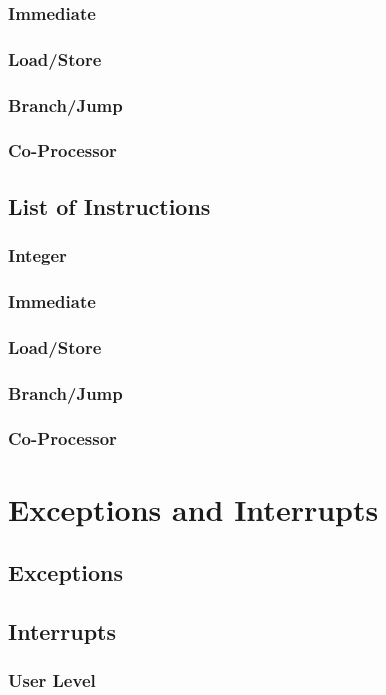 \documentclass[letterpaper, 11pt]{article}
\begin{document}
\subsubsection{Immediate}
\subsubsection{Load/Store}
\subsubsection{Branch/Jump}
\subsubsection{Co-Processor}
\subsection{List of Instructions}
\subsubsection{Integer}
\subsubsection{Immediate}
\subsubsection{Load/Store}
\subsubsection{Branch/Jump}
\subsubsection{Co-Processor}



\section{Exceptions and Interrupts}
\subsection{Exceptions}


\subsection{Interrupts}
\subsubsection{User Level}
\end{document}
